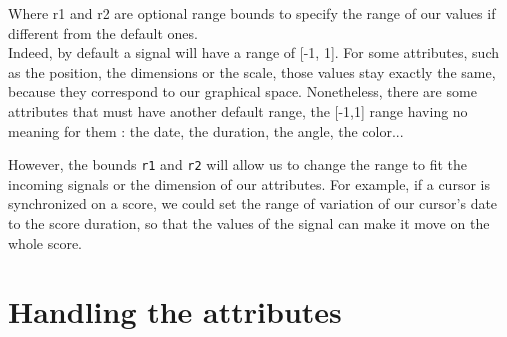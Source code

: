 \documentclass[a4paper]{article}
\newcommand{\OSC}[1]		{\texttt{#1}}
\begin{document}
Where r1 and r2 are optional range bounds to specify the range of our values if different from the default ones.
\\

Indeed, by default a signal will have a range of [-1, 1]. For some attributes, such as the position, the dimensions or the scale, those values stay exactly the same, because they correspond to our graphical space. Nonetheless, there are some attributes that must have another default range, the [-1,1] range having no meaning for them : the date, the duration, the angle, the color...
%
%

However, the bounds \OSC{r1} and \OSC{r2} will allow us to change the range to fit the incoming signals or the dimension of our attributes. For example, if a cursor is synchronized on a score, we could set the range of variation of our cursor's date to the score duration, so that the values of the signal can make it move on the whole score.

\section{Handling the attributes}\label{sec:handler}
\end{document}
